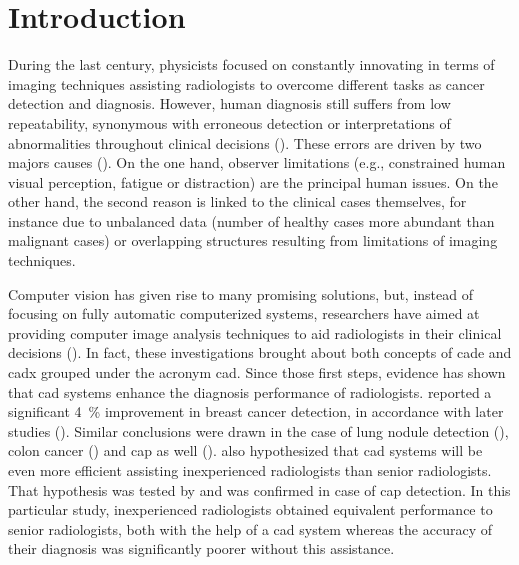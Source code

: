 \section{Introduction} \label{sec:introduction}

During the last century, physicists focused on constantly innovating in terms of imaging techniques assisting radiologists to overcome different tasks as cancer detection and diagnosis. However, human diagnosis still suffers from low repeatability, synonymous with erroneous detection or interpretations of abnormalities throughout clinical decisions (\cite{Giger2008,Hambrock2013}). These errors are driven by two majors causes (\cite{Giger2008}). On the one hand, observer limitations (e.g., constrained human visual perception, fatigue or distraction) are the principal human issues. On the other hand, the second reason is linked to the clinical cases themselves, for instance due to unbalanced data (number of healthy cases more abundant than malignant cases) or overlapping structures resulting from limitations of imaging techniques.

Computer vision has given rise to many promising solutions, but, instead of focusing on fully automatic computerized systems, researchers have aimed at providing computer image analysis techniques to aid radiologists in their clinical decisions (\cite{Giger2008}). In fact, these investigations brought about both concepts of \ac{cade} and \ac{cadx} grouped under the acronym \acs{cad}. Since those first steps, evidence has shown that \acs{cad} systems enhance the diagnosis performance of radiologists. \cite{Chan1999} reported a significant 4~\% improvement in breast cancer detection, in accordance with later studies (\cite{Dean2006}). Similar conclusions were drawn in the case of lung nodule detection (\cite{Li2004}), colon cancer (\cite{Petrick2008}) and \ac{cap} as well (\cite{Hambrock2013}). \cite{Chan1999} also hypothesized that \acs{cad} systems will be even more efficient assisting inexperienced radiologists than senior radiologists. That hypothesis was tested by \cite{Hambrock2013} and was confirmed in case of \ac{cap} detection. In this particular study, inexperienced radiologists obtained equivalent performance to senior radiologists, both with the help of a \acs{cad} system whereas the accuracy of their diagnosis was significantly poorer without this assistance.

